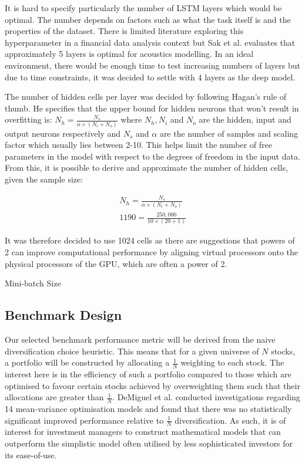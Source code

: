 \documentclass[10pt,onecolumn,letterpaper]{article}
\begin{document}
It is hard to specify particularly the number of LSTM layers which would be optimal. The number depends on factors such as what the task itself is and the properties of the dataset. There is limited literature exploring this hyperparameter in a financial data analysis context but Sak et al.\cite{Sak} evaluates that approximately 5 layers is optimal for acoustics modelling. In an ideal environment, there would be enough time to test increasing numbers of layers but due to time constraints, it was decided to settle with 4 layers as the deep model. 

The number of hidden cells per layer was decided by following Hagan's rule of thumb\cite{Hagan}. He specifies that the upper bound for hidden neurons that won't result in overfitting is: $N_{h} = \frac{N_{s}}{\alpha \times (N_{i}+N_{o})}$ where $N_{h}, N_{i}$ and $N_{o}$ are the hidden, input and output neurons respectively and $N_{s}$ and $\alpha$ are the number of samples and scaling factor which usually lies between 2-10. This helps limit the number of free parameters in the model with respect to the degrees of freedom in the input data. From this, it is possible to derive and approximate the number of hidden cells, given the sample size: 

\vskip -0.5cm
\begin{gather*}
 	N_{h} = \frac{N_{s}}{\alpha \times (N_{i}+N_{o})} \\
	1190 = \frac{250,000}{10 \times (20+1)}
\end{gather*}

It was therefore decided to use 1024 cells as there are suggestions that powers of 2 can improve computational performance by aligning virtual processors onto the physical processors of the GPU, which are often a power of 2. 

Mini-batch Size

\subsection{Benchmark Design} \label{benchmark}

Our selected benchmark performance metric will be derived from the naive diversification choice heuristic. This means that for a given universe of $N$ stocks, a portfolio will be constructed by allocating a $\frac{1}{N}$ weighting to each stock. The interest here is in the efficiency of such a portfolio compared to those which are optimised to favour certain stocks achieved by overweighting them such that their allocations are greater than $\frac{1}{N}$. DeMiguel et al. conducted investigations\cite{DeMiguel} regarding 14 mean-variance optimisation models and found that there was no statistically significant improved performance relative to $\frac{1}{N}$ diversification. As such, it is of interest for investment managers to construct mathematical models that can outperform the simplistic model often utilised by less sophisticated investors for its ease-of-use. 
\end{document}

